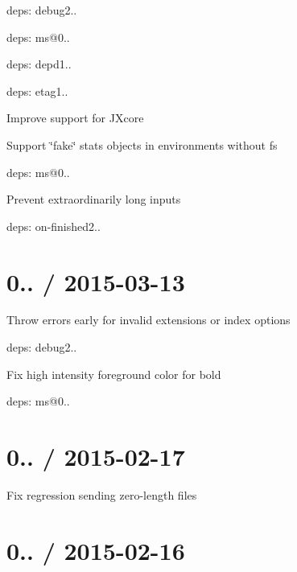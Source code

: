 \begin{DoxyItemize}
\item deps\+: debug2..
\begin{DoxyItemize}
\item deps\+: ms@0..
\end{DoxyItemize}
\item deps\+: depd1..
\item deps\+: etag1..
\begin{DoxyItemize}
\item Improve support for J\+Xcore
\item Support \char`\"{}fake\char`\"{} stats objects in environments without {\ttfamily fs}
\end{DoxyItemize}
\item deps\+: ms@0..
\begin{DoxyItemize}
\item Prevent extraordinarily long inputs
\end{DoxyItemize}
\item deps\+: on-\/finished2..
\end{DoxyItemize}

\section*{0.. / 2015-\/03-\/13 }


\begin{DoxyItemize}
\item Throw errors early for invalid {\ttfamily extensions} or {\ttfamily index} options
\item deps\+: debug2..
\begin{DoxyItemize}
\item Fix high intensity foreground color for bold
\item deps\+: ms@0..
\end{DoxyItemize}
\end{DoxyItemize}

\section*{0.. / 2015-\/02-\/17 }


\begin{DoxyItemize}
\item Fix regression sending zero-\/length files
\end{DoxyItemize}

\section*{0.. / 2015-\/02-\/16 }


